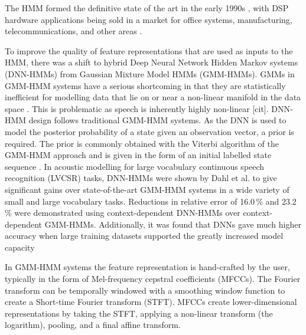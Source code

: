 \documentclass[12pt]{llncs}
\begin{document}
The HMM formed the definitive state of the art in the early 1990s \cite{rabiner1989tutorial}, with DSP hardware applications being sold in a market for office systems, manufacturing, telecommunications, and other areas \cite[p.487]{rabiner1993fundamentals}. 



To improve the quality of feature representations that are used as inputs to the HMM, there was a shift to hybrid Deep Neural Network Hidden Markov systems (DNN-HMMs) from Gaussian Mixture Model HMMs (GMM-HMMs). GMMs in GMM-HMM systems have a serious shortcoming in that they are statistically inefficient for modelling data that lie on or near a non-linear manifold in the data space \cite{hinton2012deep}. This is problematic as speech is inherently highly non-linear [cit]. DNN-HMM design follows traditional GMM-HMM systems. As the DNN is used to model the posterior probability of a state given an observation vector, a prior is required. The prior is commonly obtained with the Viterbi algorithm of the GMM-HMM approach and is given in the form of an initial labelled state sequence \cite{li2013hybrid}. In acoustic modelling for large vocabulary continuous speech recognition (LVCSR) tasks, DNN-HMMs were shown by Dahl et al. \cite{dahl2012context} to give significant gains over state-of-the-art GMM-HMM systems in a wide variety of small and large vocabulary tasks. Reductions in relative error of 16.0\,\% and 23.2\,\% were demonstrated using context-dependent DNN-HMMs over context-dependent GMM-HMMs. Additionally, it was found that DNNs gave much higher accuracy when large training datasets supported the greatly increased model capacity \cite{deng2014achievements}

In GMM-HMM systems the feature representation is hand-crafted by the user, typically in the form of Mel-frequency cepstral coefficients (MFCCs). The Fourier transform can be temporally windowed with a smoothing window function to create a Short-time Fourier transform (STFT). MFCCs create lower-dimensional representations by taking the STFT, applying a non-linear transform (the logarithm), pooling, and a final affine transform. 
\end{document}
